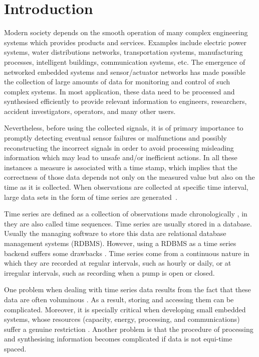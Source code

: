 \section{Introduction}

Modern society depends on the smooth operation of many complex
engineering systems which provides products and services. Examples
include electric power systems, water distributions networks,
transportation systems, manufacturing processes, intelligent
buildings, communication systems, etc. The emergence of networked
embedded systems and sensor/actuator networks has made possible the
collection of large amounts of data for monitoring and control of such
complex systems. In most application, these data need to be processed
and synthesised efficiently to provide relevant information to
engineers, researchers, accident investigators, operators, and many
other users.  

Nevertheless, before using the collected signals, it is of primary
importance to promptly detecting eventual sensor failures or
malfunctions and possibly reconstructing the incorrect signals in
order to avoid processing misleading information which may lead to
unsafe and/or inefficient actions.  In all these instances a measure
is associated with a time stamp, which implies that the correctness of
those data depends not only on the measured value but also on the time
as it is collected. When observations are collected at specific time
interval, large data sets in the form of time series are
generated~\cite{basu07:_autom}.  

Time series are defined as a collection of observations made
chronologically \cite{fu11}, in \cite{last:hetland} they are also
called time sequences.  Time series are usually stored in a
database. Usually the managing software to store this data are
relational database management systems (RDBMS). However, using a RDBMS
as a time series backend suffers some drawbacks
\cite{schmidt95,stonebraker09:scidb,zhang11}. Time series come from a
continuous nature in which they are recorded at regular intervals,
such as hourly or daily, or at irregular intervals, such as recording
when a pump is open or closed. 

One problem when dealing with time series data results from the fact
that these data are often voluminous \cite{fu11}. As a result, storing
and accessing them can be complicated. Moreover, it is specially
critical when developing small embedded systems, whose resources
(capacity, energy, processing, and communications) suffer a genuine
restriction \cite{yaogehrke02}.  Another problem is that the procedure
of processing and synthesising information becomes complicated if data
is not equi-time spaced.



